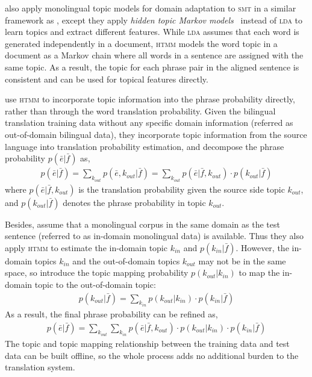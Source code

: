 \citet{hasler-12} also apply monolingual topic models for domain adaptation to
\textsc{smt} in a similar framework as \citet{Eidelman-12}, except
they apply \emph{hidden topic Markov models}~\citep[\textsc{htmm}]{gruber-07} 
instead of \textsc{lda} to learn topics and extract different features. 
While \textsc{lda} assumes that each word is generated
independently in a document, \textsc{htmm} models the word topic in a
document as a Markov chain where all words in a sentence are assigned
with the same topic. As a result, the topic
for each phrase pair in the aligned sentence is consistent and can be
used for topical features directly.


\citet{su-12} use \textsc{htmm} to incorporate topic information
into the phrase probability directly, rather than through the word
translation probability.
Given the bilingual translation
training data without any specific domain information (referred as
out-of-domain bilingual data), they incorporate topic information
from the source language into translation probability estimation, and
decompose the phrase probability $p(\bar{e}|\bar{f})$ as,
\begin{align}
p(\bar{e}|\bar{f}) = \sum_{k_{out}} p(\bar{e}, k_{out} | \bar{f}) = \sum_{k_{out}} p(\bar{e} | \bar{f}, k_{out})  \cdot p(k_{out} | \bar{f})
\end{align}
where $p(\bar{e} | \bar{f}, k_{out})$ is the translation probability given 
the source side topic $k_{out}$, and $p(k_{out} | \bar{f})$ denotes the 
phrase probability in topic $k_{out}$.

Besides, \citet{su-12} assume that a monolingual corpus in the
same domain as the test sentence (referred to as in-domain monolingual
data) is available. Thus they also apply \textsc{htmm} to estimate the
in-domain topic $k_{in}$ and $p(k_{in} | \bar{f})$.  However, the
in-domain topics $k_{in}$ and the out-of-domain topics $k_{out}$ may
not be in the same space, so \citet{su-12} introduce the topic mapping
probability $p(k_{out} | k_{in})$ to map the in-domain topic to the
out-of-domain topic:
\begin{align}
p(k_{out} | \bar{f}) = \sum_{k_{in}} p(k_{out} | k_{in}) \cdot  p(k_{in} | \bar{f})
\end{align}
As a result, the final phrase probability can be refined as,
\begin{align}
p(\bar{e}|\bar{f}) = \sum_{k_{out}} \sum_{k_{in}} p(\bar{e} | \bar{f}, k_{out}) \cdot p(k_{out} | k_{in}) \cdot p(k_{in} | \bar{f})
\end{align}
The topic and topic mapping relationship
between the training data and test data can be built offline, so the
whole process adds no additional burden to the translation system.

